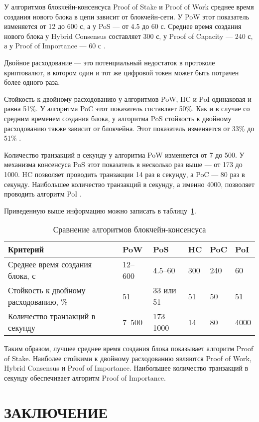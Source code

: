 У алгоритмов блокчейн-консенсуса Proof of Stake и Proof of Work среднее время создания нового блока в цепи зависит от блокчейн-сети. 
У PoW этот показатель изменяется от 12 до 600 с, а у PoS --- от 4.5 до 60 с. 
Среднее время создания нового блока у Hybrid Consensus составляет 300 с, у Proof of Capacity --- 240 с, а у Proof of Importance --- 60 с \cite{Auhl2022}.

Двойное расходование --- это потенциальный недостаток в протоколе криптовалют, в котором один и тот же цифровой токен может быть потрачен более одного раза.

Стойкость к двойному расходованию у алгоритмов PoW, HC и PoI одинаковая и равна 51\%. 
У алгоритма PoC этот показатель составляет 50\%. 
Как и в случае со средним временем создания блока, у алгоритма PoS стойкость к двойному расходованию также зависит от блокчейна. 
Этот показатель изменяется от 33\% до 51\% \cite{Auhl2022}.

Количество транзакций в секунду у алгоритма PoW изменяется от 7 до 500. 
У механизма консенсуса PoS этот показатель в несколько раз выше --- от 173 до 1000. 
HC позволяет проводить транзакции 14 раз в секунду, а PoC --- 80 раз в секунду. 
Наибольшее количество транзакций в секунду, а именно 4000, позволяет проводить алгоритм PoI \cite{Auhl2022}.

Приведенную выше информацию можно записать в таблицу~\ref{tabular:comparison}. 

\begin{table}[H]
\caption{Сравнение алгоритмов блокчейн-консенсуса}
\label{tabular:comparison}
\begin{tabular}{|p{3cm}|p{2cm}|p{2.4cm}|p{}|p{}|p{}|}
\hline
\textbf{Критерий} & \textbf{PoW} & \textbf{PoS} & \textbf{HC} & \textbf{PoC} & \textbf{PoI}
\tabularnewline
\hline
Среднее время создания блока, с & 12--600 & 4.5--60 & 300 & 240 & 60
\tabularnewline
\hline
Стойкость к двойному расходованию, \% & 51 & 33 или 51 & 51 & 50 & 51
\tabularnewline
\hline
Количество транзакций в секунду & 7--500 & 173--1000 & 14 & 80 & 4000
\tabularnewline
\hline
\end{tabular}
\end{table}

Таким образом, лучшее среднее время создания блока показывает алгоритм Proof of Stake. 
Наиболее стойкими к двойному расходованию являются Proof of Work, Hybrid Consensus и Proof of Importance. 
Наибольшее количество транзакций в секунду обеспечивает алгоритм Proof of Importance.

{\centering \chapter*{ЗАКЛЮЧЕНИЕ}}


